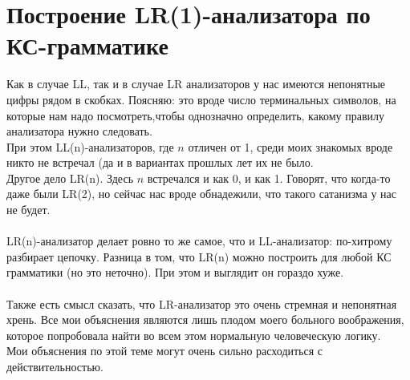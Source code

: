\documentclass[14pt]{extreport}
\begin{document}
	
	\chapter{Построение LR(1)-анализатора по КС-грамматике}
	Как в случае LL, так и в случае LR анализаторов у нас имеются непонятные цифры
	рядом в скобках. Поясняю: это вроде число терминальных символов, на которые нам 
	надо посмотреть,чтобы однозначно определить, какому правилу анализатора нужно
	следовать.\\
	При этом LL(n)-анализаторов, где $n$ отличен от 1, среди моих знакомых вроде никто
	не встречал (да и в вариантах прошлых лет их не было.\\
	Другое дело LR(n). Здесь $n$ встречался и как 0, и как 1. Говорят, что когда-то даже
	были LR(2), но сейчас нас вроде обнадежили, что такого сатанизма у нас не будет.\\\\
	LR(n)-анализатор делает ровно то же самое, что и LL-анализатор: по-хитрому разбирает
	цепочку. Разница в том, что LR(n) можно построить для любой КС грамматики (но это
	неточно). При этом и выглядит он гораздо хуже.\\\\
	Также есть смысл сказать, что LR-анализатор это очень стремная и непонятная хрень.
	Все мои объяснения являются лишь плодом моего больного воображения, которое попробовала
	найти во всем этом нормальную человеческую логику.\\
	Мои объяснения по этой теме могут очень сильно расходиться с действительностью.
\end{document}
